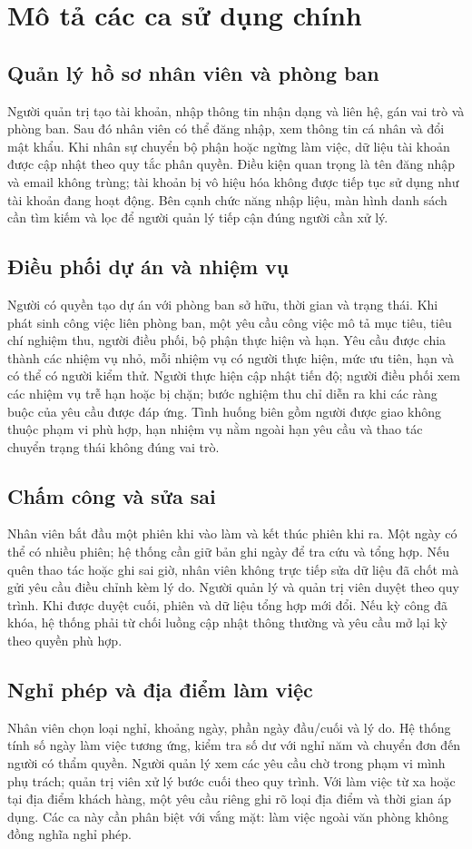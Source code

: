 \documentclass[12pt,a4paper,oneside]{report}
\begin{document}
\section{Mô tả các ca sử dụng chính}
\subsection{Quản lý hồ sơ nhân viên và phòng ban}
Người quản trị tạo tài khoản, nhập thông tin nhận dạng và liên hệ, gán vai trò và phòng ban. Sau đó nhân viên có thể đăng nhập, xem thông tin cá nhân và đổi mật khẩu. Khi nhân sự chuyển bộ phận hoặc ngừng làm việc, dữ liệu tài khoản được cập nhật theo quy tắc phân quyền. Điều kiện quan trọng là tên đăng nhập và email không trùng; tài khoản bị vô hiệu hóa không được tiếp tục sử dụng như tài khoản đang hoạt động. Bên cạnh chức năng nhập liệu, màn hình danh sách cần tìm kiếm và lọc để người quản lý tiếp cận đúng người cần xử lý.

\subsection{Điều phối dự án và nhiệm vụ}
Người có quyền tạo dự án với phòng ban sở hữu, thời gian và trạng thái. Khi phát sinh công việc liên phòng ban, một yêu cầu công việc mô tả mục tiêu, tiêu chí nghiệm thu, người điều phối, bộ phận thực hiện và hạn. Yêu cầu được chia thành các nhiệm vụ nhỏ, mỗi nhiệm vụ có người thực hiện, mức ưu tiên, hạn và có thể có người kiểm thử. Người thực hiện cập nhật tiến độ; người điều phối xem các nhiệm vụ trễ hạn hoặc bị chặn; bước nghiệm thu chỉ diễn ra khi các ràng buộc của yêu cầu được đáp ứng. Tình huống biên gồm người được giao không thuộc phạm vi phù hợp, hạn nhiệm vụ nằm ngoài hạn yêu cầu và thao tác chuyển trạng thái không đúng vai trò.

\subsection{Chấm công và sửa sai}
Nhân viên bắt đầu một phiên khi vào làm và kết thúc phiên khi ra. Một ngày có thể có nhiều phiên; hệ thống cần giữ bản ghi ngày để tra cứu và tổng hợp. Nếu quên thao tác hoặc ghi sai giờ, nhân viên không trực tiếp sửa dữ liệu đã chốt mà gửi yêu cầu điều chỉnh kèm lý do. Người quản lý và quản trị viên duyệt theo quy trình. Khi được duyệt cuối, phiên và dữ liệu tổng hợp mới đổi. Nếu kỳ công đã khóa, hệ thống phải từ chối luồng cập nhật thông thường và yêu cầu mở lại kỳ theo quyền phù hợp.

\subsection{Nghỉ phép và địa điểm làm việc}
Nhân viên chọn loại nghỉ, khoảng ngày, phần ngày đầu/cuối và lý do. Hệ thống tính số ngày làm việc tương ứng, kiểm tra số dư với nghỉ năm và chuyển đơn đến người có thẩm quyền. Người quản lý xem các yêu cầu chờ trong phạm vi mình phụ trách; quản trị viên xử lý bước cuối theo quy trình. Với làm việc từ xa hoặc tại địa điểm khách hàng, một yêu cầu riêng ghi rõ loại địa điểm và thời gian áp dụng. Các ca này cần phân biệt với vắng mặt: làm việc ngoài văn phòng không đồng nghĩa nghỉ phép.
\end{document}
